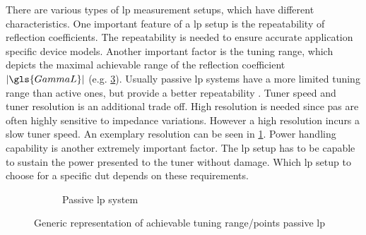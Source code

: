 \documentclass[12pt,a4paper,parskip=full,abstract=true,BCOR=12mm,twoside,open=right]{scrreprt}
\providecommand{\abs}[1]{\lvert#1\rvert}
\begin{document}
There are various types of \gls{lp} measurement setups, which have different
characteristics. One important feature of a \gls{lp} setup is the repeatability of reflection
coefficients. The repeatability is needed to ensure accurate application
specific device models. Another important factor is the tuning range, which
depicts the maximal achievable range of the reflection coefficient $\abs{\gls{GammaL}}$
(e.g. \cref{fig:range_passive}). Usually passive \gls{lp}
systems have a more limited tuning range than active ones, but provide a
better repeatability \cite{ghannouchi_load-pull_2013}. Tuner speed and tuner
resolution is an additional trade off. High resolution is needed since \glspl{pa} are often
highly sensitive to impedance variations. However a high resolution incurs
a slow tuner speed. An exemplary resolution can be seen in \cref{fig:generic_emt}.
Power handling capability is another extremely important factor. The \gls{lp}
setup has to be capable to sustain the power presented to the tuner without
damage. Which \gls{lp} setup to choose for a specific \gls{dut} depends on
these requirements.

\begin{figure}[htb]
    \begin{subfigure}[b]{.5\linewidth}
        \centering
        \caption{}
        \label{fig:generic_emt}
    \end{subfigure}%
    \begin{subfigure}[b]{.5\linewidth}
        \centering
        \caption{Passive \gls{lp} system}
        \label{fig:range_passive}
    \end{subfigure}
    \caption{Generic representation of achievable tuning range/points passive \gls{lp}}
\end{figure}
\end{document}
